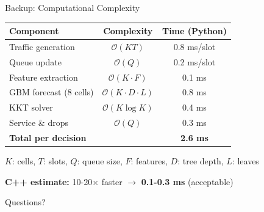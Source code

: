 \documentclass[aspectratio=169]{beamer}
\begin{document}
\begin{frame}{Backup: Computational Complexity}
\begin{table}
\small
\begin{tabular}{lcc}
\toprule
\textbf{Component} & \textbf{Complexity} & \textbf{Time (Python)} \\
\midrule
Traffic generation & $\mathcal{O}(KT)$ & 0.8 ms/slot \\
Queue update & $\mathcal{O}(Q)$ & 0.2 ms/slot \\
Feature extraction & $\mathcal{O}(K \cdot F)$ & 0.1 ms \\
GBM forecast (8 cells) & $\mathcal{O}(K \cdot D \cdot L)$ & 0.8 ms \\
KKT solver & $\mathcal{O}(K \log K)$ & 0.4 ms \\
Service \& drops & $\mathcal{O}(Q)$ & 0.3 ms \\
\midrule
\textbf{Total per decision} & & \textbf{2.6 ms} \\
\bottomrule
\end{tabular}
\end{table}

$K$: cells, $T$: slots, $Q$: queue size, $F$: features, $D$: tree depth, $L$: leaves

\textbf{C++ estimate:} 10-20× faster $\rightarrow$ \textbf{0.1-0.3 ms} (acceptable)
\end{frame}

\begin{frame}[standout]
\begin{center}
\Huge Questions?
\end{center}
\end{frame}
\end{document}
